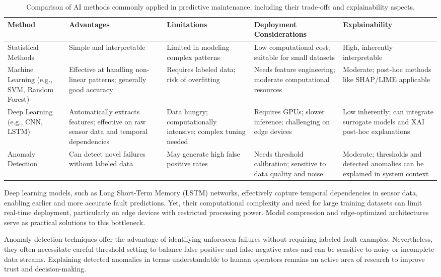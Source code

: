 \documentclass[sigconf]{acmart}
\begin{document}
\begin{table*}[htbp]
\centering
\caption{Comparison of AI methods commonly applied in predictive maintenance, including their trade-offs and explainability aspects.}
\label{tab:pm_methods}
\begin{adjustbox}{max width=\textwidth}
\begin{tabular}{@{}lllll@{}}
\toprule
Method & Advantages & Limitations & Deployment Considerations & Explainability \\ \midrule
Statistical Methods & Simple and interpretable & Limited in modeling complex patterns & Low computational cost; suitable for small datasets & High, inherently interpretable \\
Machine Learning (e.g., SVM, Random Forest) & Effective at handling non-linear patterns; generally good accuracy & Requires labeled data; risk of overfitting & Needs feature engineering; moderate computational resources & Moderate; post-hoc methods like SHAP/LIME applicable \\
Deep Learning (e.g., CNN, LSTM) & Automatically extracts features; effective on raw sensor data and temporal dependencies & Data hungry; computationally intensive; complex tuning needed & Requires GPUs; slower inference; challenging on edge devices & Low inherently; can integrate surrogate models and XAI post-hoc explanations \\
Anomaly Detection & Can detect novel failures without labeled data & May generate high false positive rates & Needs threshold calibration; sensitive to data quality and noise & Moderate; thresholds and detected anomalies can be explained in system context \\ \bottomrule
\end{tabular}
\end{adjustbox}
\end{table*}

Deep learning models, such as Long Short-Term Memory (LSTM) networks, effectively capture temporal dependencies in sensor data, enabling earlier and more accurate fault predictions. Yet, their computational complexity and need for large training datasets can limit real-time deployment, particularly on edge devices with restricted processing power. Model compression and edge-optimized architectures serve as practical solutions to this bottleneck.

Anomaly detection techniques offer the advantage of identifying unforeseen failures without requiring labeled fault examples. Nevertheless, they often necessitate careful threshold setting to balance false positive and false negative rates and can be sensitive to noisy or incomplete data streams. Explaining detected anomalies in terms understandable to human operators remains an active area of research to improve trust and decision-making.
\end{document}
